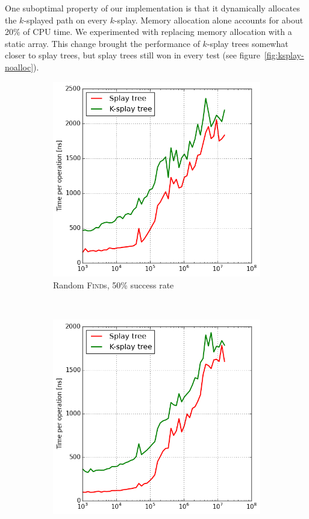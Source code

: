 One suboptimal property of our implementation is that it dynamically
allocates the $k$-splayed path on every $k$-splay. Memory allocation alone
accounts for about 20\% of CPU time.
We experimented with replacing memory allocation with a static array.
This change brought the performance of $k$-splay trees somewhat closer to
splay trees, but splay trees still won in every test
(see figure~\ref{fig:ksplay-noalloc}).

\begin{figure}
\begin{subfigure}[t]{0.48\textwidth}
	\includegraphics[width=\textwidth]{img/ksplay-noalloc-find-50}
	\caption{Random \textsc{Find}s, 50\% success rate}
\end{subfigure}
~
\begin{subfigure}[t]{0.48\textwidth}
	\includegraphics[width=\textwidth]{img/ksplay-noalloc-insert}

\end{subfigure}
\end{figure}
